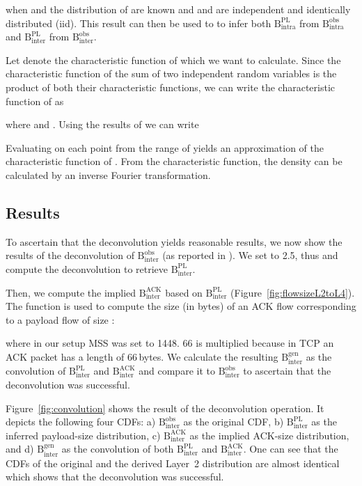\documentclass[journal,10pt]{IEEEtran}
\newcommand{\bytes}[2]{\ensuremath{\mathrm{B}^{\mathrm{#1}}_{\mathrm{#2}}}}
\begin{document}
	when  and the distribution of  are known and  and  are independent and identically distributed (iid).
	This result can then be used to to infer both
	\bytes{PL}{intra} from \bytes{obs}{intra} 
	and
	\bytes{PL}{inter} from \bytes{obs}{inter}.
	
	Let  denote the characteristic function of  which we want to calculate.
	Since the characteristic function of the sum of two independent random variables is the product of both their characteristic functions,
	we can write the characteristic function  of  as
	
	where  and .
Using the results of \cite{arXiv:math/0306237} we can write
	
	Evaluating  on each point from the range of  yields an approximation of the characteristic function of .
	From the characteristic function, the density can be calculated by an inverse Fourier transformation.


\subsection{Results}
	To ascertain that the deconvolution yields reasonable results, we now show the results of the deconvolution of
	\bytes{obs}{inter} (as reported in \cite{MSR-datacenters}).
	We set  to 2.5, thus 
	and compute the deconvolution to retrieve \bytes{PL}{inter}.
	
	Then, we compute the implied \bytes{ACK}{inter}
	based on \bytes{PL}{inter} (Figure~\ref{fig:flowsizeL2toL4}).
	The function  is used to compute the size (in bytes) of an ACK flow corresponding to a payload flow of size :
	
	where in our setup MSS was set to 1448. 66 is multiplied because in TCP an ACK packet has a length of 66\,bytes.
	We calculate the resulting \bytes{gen}{inter} as the convolution of \bytes{PL}{inter} and \bytes{ACK}{inter} and
	compare it to \bytes{obs}{inter} to ascertain that the deconvolution was successful.


	Figure~\ref{fig:convolution} shows the result of the deconvolution operation.
	It depicts the following four CDFs: 
	a) \bytes{obs}{inter} as the original CDF,
	b) \bytes{PL}{inter} as the inferred payload-size distribution, 
	c) \bytes{ACK}{inter} as the implied ACK-size distribution, and
	d) \bytes{gen}{inter} as the convolution of both \bytes{PL}{inter} and \bytes{ACK}{inter}.
	One can see that the CDFs of the original and the derived Layer~2 distribution are almost identical which shows that the deconvolution
	was successful.
	
\end{document}
